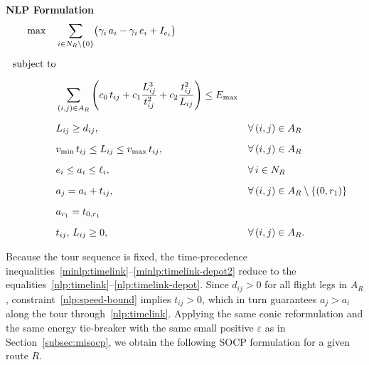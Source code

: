 \vspace{4mm}
\noindent\textbf{NLP Formulation}
\begin{align}
\max \quad
& \sum_{i \in N_R \setminus \{0\}} \bigl(\gamma_i\, a_i - \gamma_i\, e_i + I_{e_i} \bigr) \label{nlp:obj} \\[6pt]
\text{subject to} \notag \\[6pt]
& \sum_{(i,j) \in A_R} \left( c_0\, t_{ij} + c_1 \frac{L_{ij}^3}{t_{ij}^2} + c_2 \frac{t_{ij}^2}{L_{ij}} \right) \le E_{\max} \label{nlp:energy} \\[6pt]
& L_{ij} \ge d_{ij},
    && \forall\, (i,j) \in A_R \label{nlp:path-length} \\[6pt]
& v_{\min}\, t_{ij} \le L_{ij} \le v_{\max}\, t_{ij},
    && \forall\, (i,j) \in A_R \label{nlp:speed-bound} \\[6pt]
& e_i \le a_i \le \ell_i,
    && \forall\, i \in N_R \label{nlp:timewindow} \\[6pt]
& a_j = a_i + t_{ij},
    && \forall\, (i,j) \in A_R \setminus \{(0,r_1)\} \label{nlp:timelink} \\[6pt]
& a_{r_1} = t_{0,r_1} \label{nlp:timelink-depot} \\[6pt]
& t_{ij},\, L_{ij} \ge 0,
    && \forall\, (i,j) \in A_R. \label{nlp:domain}
\end{align}

Because the tour sequence is fixed, the time-precedence inequalities~\eqref{minlp:timelink}--\eqref{minlp:timelink-depot2} reduce to the equalities~\eqref{nlp:timelink}--\eqref{nlp:timelink-depot}. Since $d_{ij}>0$ for all flight legs in $A_R$, constraint~\eqref{nlp:speed-bound} implies $t_{ij}>0$, which in turn guarantees $a_j>a_i$ along the tour through~\eqref{nlp:timelink}. Applying the same conic reformulation and the same energy tie-breaker with the same small positive $\varepsilon$ as in Section~\ref{subsec:misocp}, we obtain the following SOCP formulation for a given route $R$.

